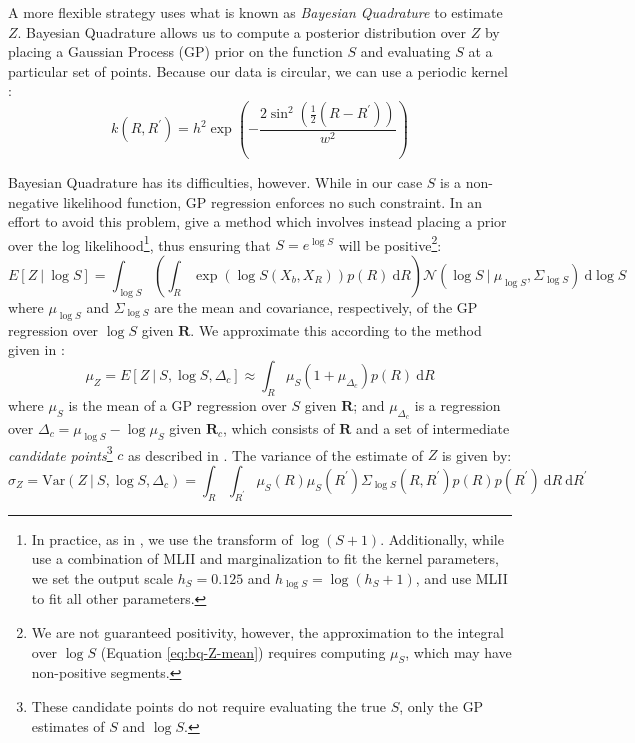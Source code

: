 \documentclass{article} %
\begin{document}
A more flexible strategy uses what is known as \emph{Bayesian
  Quadrature} \cite{Diaconis:1988uo,OHagan:1991tx} to estimate $Z$.
Bayesian Quadrature allows us to compute a posterior distribution over
$Z$ by placing a Gaussian Process (GP) prior on the function $S$ and
evaluating $S$ at a particular set of points. Because our data is
circular, we can use a periodic kernel \cite{Rasmussen:2006vz}:
\begin{equation}
k(R, R^\prime)=h^2\exp\left(-\frac{2\sin^2\left(\frac{1}{2}(R-R^\prime)\right)}{w^2}\right)
\end{equation}

Bayesian Quadrature has its difficulties, however. While in our case
$S$ is a non-negative likelihood function, GP regression enforces no
such constraint. In an effort to avoid this problem,
\cite{Osborne:2012tm} give a method which involves instead placing a
prior over the log likelihood\footnote{In practice, as in
  \cite{Osborne:2012tm}, we use the transform of
  $\log(S+1)$. Additionally, while \cite{Osborne:2012tm} use a
  combination of MLII and marginalization to fit the kernel
  parameters, we set the output scale $h_S=0.125$ and $h_{\log
    S}=\log(h_S + 1)$, and use MLII to fit all other parameters.},
thus ensuring that $S=e^{\log S}$ will be positive\footnote{We are not
  guaranteed positivity, however, the approximation to the integral
  over $\log S$ (Equation \ref{eq:bq-Z-mean}) requires computing
  $\mu_S$, which may have non-positive segments.}:
\begin{equation*}
  E[Z\ \vert \ \log S]=\int_{\log S}\left(\int_R \exp(\log{S(X_b,X_R)})p(R)\ \mathrm{d}R\right)\mathcal{N}\left(\log{S}\ \vert \ \mu_{\log S}, \Sigma_{\log S}\right)\ \mathrm{d}\log S
\end{equation*}
where $\mu_{\log S}$ and $\Sigma_{\log S}$ are the mean and
covariance, respectively, of the GP regression over $\log S$ given
$\mathbf{R}$. We approximate this according to the method given in
\cite{Osborne:2012tm}:
\begin{equation}
  \mu_Z=E[Z\ \vert \ S, \log S, \Delta_c] \approx \int_R \mu_{S}(1 + \mu_{\Delta_c}) p(R)\ \mathrm{d}R 
  \label{eq:bq-Z-mean}
\end{equation}
where $\mu_S$ is the mean of a GP regression over $S$ given
$\mathbf{R}$; and $\mu_{\Delta_c}$ is a regression over
$\Delta_c=\mu_{\log S} - \log \mu_S$ given $\mathbf{R}_c$, which
consists of $\mathbf{R}$ and a set of intermediate \emph{candidate
  points}\footnote{These candidate points do not require evaluating
  the true $S$, only the GP estimates of $S$ and $\log S$.} $c$ as
described in \cite{Osborne:2012tm}. The variance of the estimate of
$Z$ is given by:
\begin{equation}
  \sigma_Z=\mathrm{Var}(Z\ \vert \ S, \log S, \Delta_c) = \int_R\int_{R^\prime} \mu_S(R)\mu_S(R^\prime) \Sigma_{\log S}(R, R^\prime)p(R)p(R^\prime)\ \mathrm{d}R\ \mathrm{d}R^\prime
  \label{eq:bq-Z-var}
\end{equation}
\end{document}
